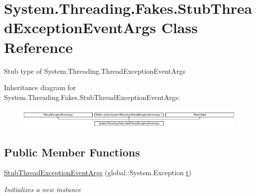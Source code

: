\hypertarget{class_system_1_1_threading_1_1_fakes_1_1_stub_thread_exception_event_args}{\section{System.\-Threading.\-Fakes.\-Stub\-Thread\-Exception\-Event\-Args Class Reference}
\label{class_system_1_1_threading_1_1_fakes_1_1_stub_thread_exception_event_args}
}


Stub type of System.\-Threading.\-Thread\-Exception\-Event\-Args 


Inheritance diagram for System.\-Threading.\-Fakes.\-Stub\-Thread\-Exception\-Event\-Args\-:\begin{figure}[H]
\begin{center}
\leavevmode
\includegraphics[height=1.011743cm]{class_system_1_1_threading_1_1_fakes_1_1_stub_thread_exception_event_args}
\end{center}
\end{figure}
\subsection*{Public Member Functions}
\begin{DoxyCompactItemize}
\item 
\hyperlink{class_system_1_1_threading_1_1_fakes_1_1_stub_thread_exception_event_args_a44194f93e3c307bcb06999ddcba13085}{Stub\-Thread\-Exception\-Event\-Args} (global\-::\-System.\-Exception \hyperlink{jquery-1_810_82_8min_8js_a23c5666e83bbbceee94adcd0851f50c4}{t})
\begin{DoxyCompactList}\small\item\em Initializes a new instance\end{DoxyCompactList}\end{DoxyCompactItemize}
